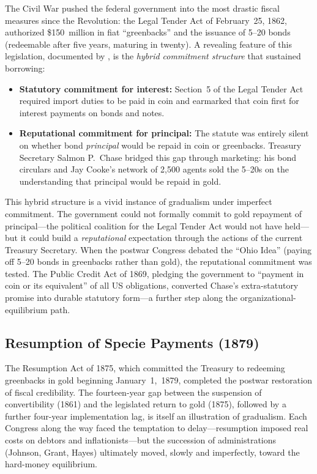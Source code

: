 \documentclass[12pt]{article}
\begin{document}
The Civil War pushed the federal government into the most drastic fiscal
measures since the Revolution: the Legal Tender Act of February~25, 1862,
authorized \$150~million in fiat ``greenbacks'' and the issuance of 5--20
bonds (redeemable after five years, maturing in twenty).  A revealing
feature of this legislation, documented by \citet{hallsargent2014}, is
the \emph{hybrid commitment structure} that sustained borrowing:

\begin{itemize}
  \item \textbf{Statutory commitment for interest:} Section~5 of the Legal
    Tender Act required import duties to be paid in coin and earmarked
    that coin first for interest payments on bonds and notes.
  \item \textbf{Reputational commitment for principal:} The statute was
    entirely silent on whether bond \emph{principal} would be repaid in
    coin or greenbacks.  Treasury Secretary Salmon P.~Chase bridged this
    gap through marketing: his bond circulars and Jay Cooke's network of
    2,500 agents sold the 5--20s on the understanding that principal
    would be repaid in gold.
\end{itemize}

This hybrid structure is a vivid instance of gradualism under imperfect
commitment.  The government could not formally commit to gold repayment
of principal---the political coalition for the Legal Tender Act would not
have held---but it could build a \emph{reputational} expectation through
the actions of the current Treasury Secretary.  When the postwar Congress
debated the ``Ohio Idea'' (paying off 5--20 bonds in greenbacks rather
than gold), the reputational commitment was tested.  The Public Credit
Act of 1869, pledging the government to ``payment in coin or its
equivalent'' of all US obligations, converted Chase's extra-statutory
promise into durable statutory form---a further step along the
organizational-equilibrium path.

\subsection{Resumption of Specie Payments (1879)}

The Resumption Act of 1875, which committed the Treasury to redeeming
greenbacks in gold beginning January~1,~1879, completed the postwar
restoration of fiscal credibility.  The fourteen-year gap between the
suspension of convertibility (1861) and the legislated return to gold
(1875), followed by a further four-year implementation lag, is itself an
illustration of gradualism.  Each Congress along the way faced the
temptation to delay---resumption imposed real costs on debtors and
inflationists---but the succession of administrations (Johnson, Grant,
Hayes) ultimately moved, slowly and imperfectly, toward the hard-money
equilibrium.
\end{document}
